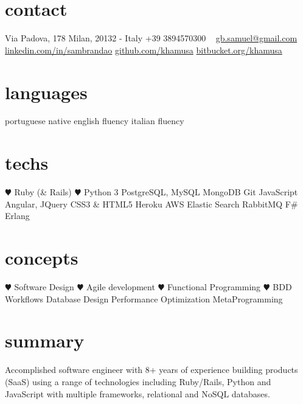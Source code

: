 \documentclass[]{friggeri-cv} %
\begin{document}


\begin{aside} %
\section{contact}
Via Padova, 178
Milan, 20132 - Italy
+39 3894570300
~
\href{mailto:gb.samuel@gmail.com}{gb.samuel@gmail.com}
\href{http://it.linkedin.com/in/sambrandao}{linkedin.com/in/sambrandao}
\href{http://github.com/khamusa}{github.com/khamusa}
\href{http://bitbucket.org/khamusa}{bitbucket.org/khamusa}
\section{languages}
portuguese native
english fluency
italian fluency
\section{techs}
{\color{red} $\varheartsuit$} Ruby (\& Rails)
{\color{red} $\varheartsuit$} Python 3
PostgreSQL, MySQL
MongoDB
Git
JavaScript
Angular, JQuery
CSS3 \& HTML5
Heroku
AWS
Elastic Search
RabbitMQ
F\#
Erlang
\section{concepts}
{\color{red} $\varheartsuit$} Software Design
{\color{red} $\varheartsuit$} Agile development
{\color{red} $\varheartsuit$} Functional Programming
{\color{red} $\varheartsuit$} BDD Workflows
Database Design
Performance Optimization
MetaProgramming
\end{aside}


\section{summary}
Accomplished software engineer with 8+ years of experience building products (SaaS)
using a range of technologies including Ruby/Rails, Python and JavaScript with multiple frameworks, relational and NoSQL databases.
\end{document}
